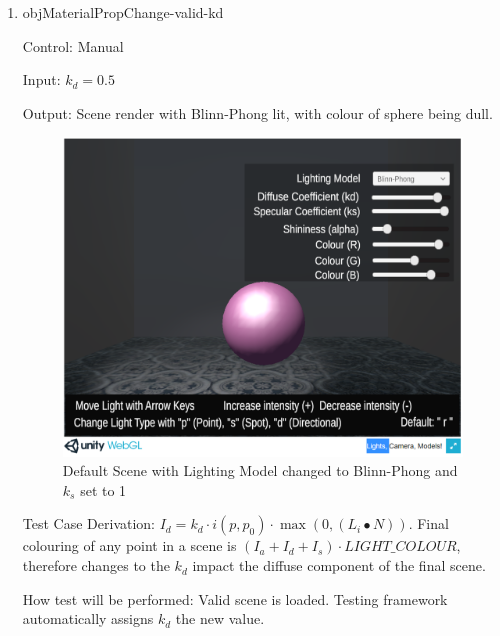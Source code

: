 \documentclass[12pt, titlepage]{article}
\begin{document}
\begin{enumerate}
	\item{objMaterialPropChange-valid-kd\\}
	
	Control: Manual
	
	Input: $k_{d} = 0.5$
	
	Output: Scene render with Blinn-Phong lit, with colour of sphere being dull.
	\begin{figure}[h]
		\centering
		\includegraphics[scale=0.25]{./images/sphere-lit-blinnphong-ks1}
		\caption{Default Scene with Lighting Model changed to Blinn-Phong and 
			$k_{s}$ set to 1}
		\label{fig:blinnPhong-kd0.5}
	\end{figure}	
	
	
	Test Case Derivation: $I_{d} = k_{d}\cdot i(p,p_{0}) \cdot 
	\max(0,(L_{i}\bullet N))$. Final colouring of any point in a scene is 
	$(I_{a}+I_{d}+I_{s})\cdot LIGHT\_COLOUR$, therefore changes to the $k_{d}$ 
	impact the diffuse component of the final scene.
	
	How test will be performed: Valid scene is loaded. Testing framework 
	automatically assigns $k_{d}$ the new value. 	


\end{enumerate}
\end{document}
